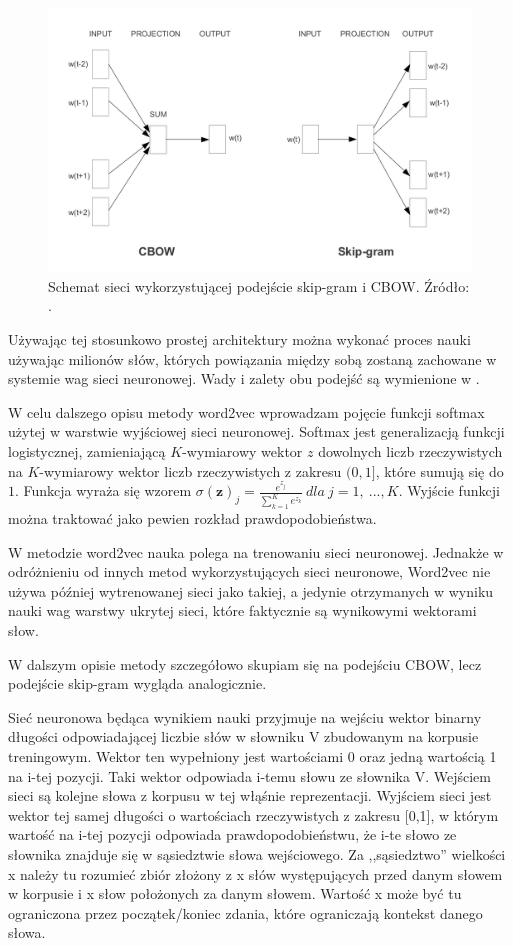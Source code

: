 \documentclass[pl]{minipw} %
\begin{document}
\begin{figure}[H]
	\centering
	\includegraphics[width=1\textwidth]{img/skipgram_cbow.png}
	\caption{Schemat sieci wykorzystującej podejście skip-gram i CBOW. Źródło: \cite{word2vec}.}
\end{figure}
Używając tej stosunkowo prostej architektury można wykonać proces nauki używając milionów słów, których powiązania między sobą zostaną zachowane w systemie wag sieci neuronowej. Wady i zalety obu podejść są wymienione w \cite{google_word2vec}.

W celu dalszego opisu metody word2vec wprowadzam pojęcie funkcji softmax użytej w warstwie wyjściowej sieci neuronowej. Softmax jest generalizacją funkcji logistycznej, zamieniającą $K$-wymiarowy wektor $z$ dowolnych liczb rzeczywistych na $K$-wymiarowy wektor liczb rzeczywistych z zakresu $(0,1]$, które sumują się do $1$. Funkcja wyraża się wzorem $\sigma (\mathbf {z} )_{j}={\frac {e^{z_{j}}}{\sum _{k=1}^{K}e^{z_{k}}}}\ dla\ j=1,\ ...,K$. Wyjście funkcji można traktować jako pewien rozkład prawdopodobieństwa.

W metodzie word2vec nauka polega na trenowaniu sieci neuronowej. Jednakże w odróżnieniu od innych metod wykorzystujących sieci neuronowe, Word2vec nie używa później wytrenowanej sieci jako takiej, a jedynie otrzymanych w wyniku nauki wag warstwy ukrytej sieci, które faktycznie są wynikowymi wektorami słow.

W dalszym opisie metody szczegółowo skupiam się na podejściu CBOW, lecz podejście skip-gram wygląda analogicznie.

Sieć neuronowa będąca wynikiem nauki przyjmuje na wejściu wektor binarny długości odpowiadającej liczbie słów w słowniku V zbudowanym na korpusie treningowym. Wektor ten wypełniony jest wartościami 0 oraz jedną wartością 1 na i-tej pozycji. Taki wektor odpowiada i-temu słowu ze słownika V. Wejściem sieci są kolejne słowa z korpusu w tej włąśnie reprezentacji. Wyjściem sieci jest wektor tej samej długości o wartościach rzeczywistych z zakresu [0,1], w którym wartość na i-tej pozycji odpowiada prawdopodobieństwu, że i-te słowo ze słownika znajduje się w sąsiedztwie słowa wejściowego. Za ,,sąsiedztwo'' wielkości x należy tu rozumieć zbiór złożony z x słów występujących przed danym słowem w korpusie i x słow położonych za danym słowem. Wartość x może być tu ograniczona przez początek/koniec zdania, które ograniczają kontekst danego słowa.
\end{document}
